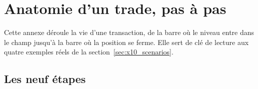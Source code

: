 \section{Anatomie d'un trade, pas à pas}
\label{app:x10_anatomie}

Cette annexe déroule la vie d'une transaction, de la barre où le niveau entre
dans le champ jusqu'à la barre où la position se ferme. Elle sert de clé de
lecture aux quatre exemples réels de la section~\ref{sec:x10_scenarios}.

\subsection{Les neuf étapes}

